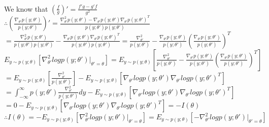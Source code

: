 \begin{answer}\\
We know that $(\frac{f}{g})'=\frac{f'g-g'f}{g^2}$\\
$\therefore (\frac{\nabla_{\theta'} p(y;\theta')}{p(y;\theta')})'=\frac{\nabla_{\theta'}^2 p(y;\theta')-\nabla_{\theta'}p(y;\theta')\nabla_{\theta'}p(y;\theta')^T}{p(y;\theta')p(y;\theta')}$\\
$=\frac{\nabla_{\theta'}^2 p(y;\theta')}{p(y;\theta')p(y;\theta')}-\frac{\nabla_{\theta'}p(y;\theta')\nabla_{\theta'}p(y;\theta')^T}{p(y;\theta')p(y;\theta')}=\frac{\nabla_{\theta'}^2 }{p(y;\theta')}-\frac{\nabla_{\theta'}p(y;\theta')}{p(y;\theta')} \left ( \frac{\nabla_{\theta'}p(y;\theta')}{p(y;\theta')} \right ) ^T$\\
$E_{y \sim p(y;\theta)} \left [ \nabla_{\theta'}^2 log p(y;\theta')|_{\theta'=\theta} \right]=E_{y \sim p(y;\theta)} \left [ \frac{\nabla_{\theta'}^2 }{p(y;\theta')}-\frac{\nabla_{\theta'}p(y;\theta')}{p(y;\theta')} \left ( \frac{\nabla_{\theta'}p(y;\theta')}{p(y;\theta')} \right ) ^T \right]$\\
$=E_{y \sim p(y;\theta)} \left [ \frac{\nabla_{\theta'}^2 }{p(y;\theta')} \right ] - E_{y \sim p(y;\theta)} \left [ \nabla_{\theta'} log p(y;\theta') \nabla_{\theta'} log p(y;\theta')^T \right ]$\\
$=\int_{-\infty}^{\infty}p(y;\theta') \frac{\nabla_{\theta'}^2 }{p(y;\theta')} dy - E_{y \sim p(y;\theta)} \left [ \nabla_{\theta'} log p(y;\theta') \nabla_{\theta'} log p(y;\theta')^T \right ]$\\
$=0-E_{y \sim p(y;\theta)} \left [ \nabla_{\theta'} log p(y;\theta') \nabla_{\theta'} log p(y;\theta')^T \right ] = -I(\theta)$\\
$\therefore I(\theta)=-E_{y \sim p(y;\theta)} \left [ \nabla_{\theta'}^2 log p(y;\theta')|_{\theta'=\theta} \right]=E_{y \sim p(y;\theta)} \left [ -\nabla_{\theta'}^2 log p(y;\theta')|_{\theta'=\theta} \right]$\\
\end{answer}
